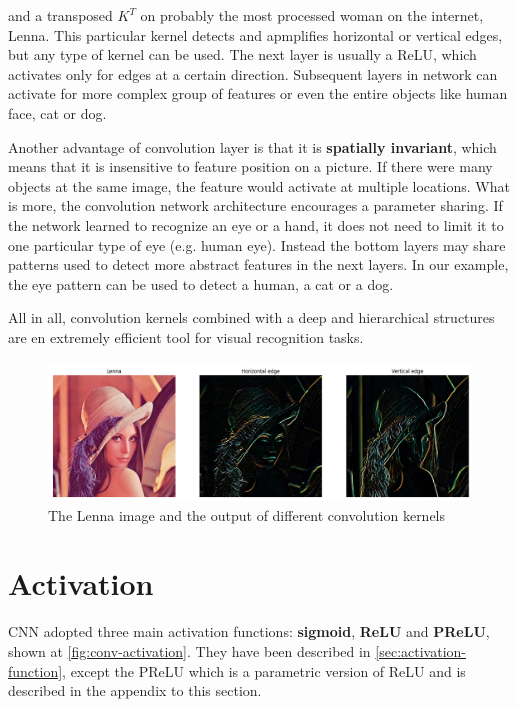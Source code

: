 and a transposed $K^T$ on probably the most processed woman on the internet, Lenna. This particular kernel detects and apmplifies horizontal or vertical edges, but any type of kernel can be used. The next layer is usually a ReLU, which activates only for edges at a certain direction. Subsequent layers in network can activate for more complex group of features or even the entire objects like human face, cat or dog. 

Another advantage of convolution layer is that it is \textbf{spatially invariant}, which means that it is insensitive to feature position on a picture. If there were many objects at the same image, the feature would activate at multiple locations. What is more, the convolution network architecture encourages a parameter sharing. If the network learned to recognize an eye or a hand, it does not need to limit it to one particular type of eye (e.g. human eye). Instead the bottom layers may share patterns used to detect more abstract features in the next layers. In our example, the eye pattern can be used to detect a human, a cat or a dog.

All in all, convolution kernels combined with a deep and hierarchical structures are en extremely efficient tool for visual recognition tasks.

\begin{figure}[h]
    \centering
    \includegraphics[width=16cm]{img/Lenna1.png}
    \caption{The Lenna image and the output of different convolution kernels}
    \label{fig:conv-lenna}
\end{figure}

\section{Activation}
\label{sec:conv-activation}

CNN adopted three main activation functions: \textbf{sigmoid}, \textbf{ReLU} and \textbf{PReLU}, shown at \ref{fig:conv-activation}. They have been described in \ref{sec:activation-function}, except the PReLU which is a parametric version of ReLU and is described in the appendix to this section.

